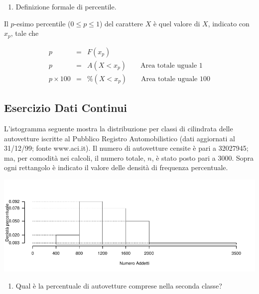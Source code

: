 \documentclass[
  11pt,
]{book}
\providecommand{\tightlist}{%
  \setlength{\itemsep}{0pt}\setlength{\parskip}{0pt}}
\theoremstyle{mytheoremstyle}
\theoremstyle{mydefstyle}
\newenvironment{sol}
  {
  \begin{tcolorbox}[enhanced,breakable,arc=0.1mm,boxrule=1pt,colback=white,colframe=iblue,
  title=\bf \fontfamily{lmss}\selectfont \hspace{.5 cm} Soluzione,drop fuzzy shadow]

}{
\end{tcolorbox}
  }
\begin{document}
\begin{enumerate}
\def\labelenumi{\alph{enumi}.}
\setcounter{enumi}{7}
\tightlist
\item
  Definizione formale di percentile.
\end{enumerate}

\begin{sol}
Il \(p\)-esimo percentile (\(0 \le p\le 1\)) del carattere \(X\)
è quel valore di \(X\), indicato con \(x_{p}\), tale che

\begin{eqnarray*}
p       &=& F(x_{p}) \\
p       &=& A(X < x_{p})      \qquad \mbox{Area\ totale\ uguale\ 1} \\
p \times 100 &=& \%(X < x_{p}) \qquad \mbox{Area\ totale\ uguale\ 100} 
\end{eqnarray*}

\end{sol}

\subsection{Esercizio Dati Continui}\label{esercizio-dati-continui}

L'istogramma seguente mostra la distribuzione per
classi di cilindrata delle autovetture iscritte al Pubblico
Registro Automobilistico (dati aggiornati al 31/12/99;
fonte www.aci.it).
Il numero di autovetture censite è pari a 32027945; ma,
per comodità nei calcoli, il numero totale, \(n\), è stato
posto pari a 3000.
Sopra ogni rettangolo è indicato il valore delle
densità di frequenza percentuale.

\begin{center}\includegraphics{Esami_passati_con_soluzioni_files/figure-latex/01-descr-18-1} \end{center}

\begin{enumerate}
\def\labelenumi{\alph{enumi}.}
\tightlist
\item
  Qual è la percentuale di autovetture comprese nella seconda classe?
\end{enumerate}
\end{document}
